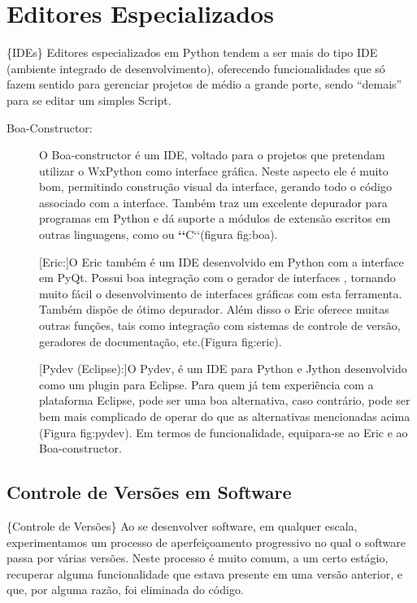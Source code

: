 \documentclass[a4paper,10pt,brazil]{sphinxmanual}
\begin{document}
\chapter{Editores Especializados}
\label{capferr:editores-especializados}
\{IDEs\} Editores especializados em Python tendem a ser mais do tipo
IDE (ambiente integrado de desenvolvimento), oferecendo
funcionalidades que só fazem sentido para gerenciar projetos de
médio a grande porte, sendo ``demais'' para se editar um simples
Script.
\begin{description}
\item[{Boa-Constructor:}] \leavevmode
O Boa-constructor é um IDE, voltado para o projetos que pretendam
utilizar o WxPython como interface gráfica. Neste aspecto ele é
muito bom, permitindo construção visual da interface, gerando todo
o código associado com a interface. Também traz um excelente
depurador para programas em Python e dá suporte a módulos de
extensão escritos em outras linguagens, como  ou
{\color{red}\bfseries{}{}`{}`}C{}`{}`(figura fig:boa).

{[}Eric:{]}O Eric também é um IDE desenvolvido em Python com a
interface em PyQt. Possui boa integração com o gerador de
interfaces , tornando muito fácil o desenvolvimento
de interfaces gráficas com esta ferramenta. Também dispõe de ótimo
depurador. Além disso o Eric oferece muitas outras funções, tais
como integração com sistemas de controle de versão, geradores de
documentação, etc.(Figura fig:eric).

{[}Pydev (Eclipse):{]}O Pydev, é um IDE para Python e Jython
desenvolvido como um plugin para Eclipse. Para quem já tem
experiência com a plataforma Eclipse, pode ser uma boa alternativa,
caso contrário, pode ser bem mais complicado de operar do que as
alternativas mencionadas acima (Figura fig:pydev). Em termos de
funcionalidade, equipara-se ao Eric e ao Boa-constructor.

\end{description}


\section{Controle de Versões em Software}
\label{capferr:controle-de-versoes-em-software}
\{Controle de Versões\} Ao se desenvolver software, em qualquer
escala, experimentamos um processo de aperfeiçoamento progressivo
no qual o software passa por várias versões. Neste processo é muito
comum, a um certo estágio, recuperar alguma funcionalidade que
estava presente em uma versão anterior, e que, por alguma razão,
foi eliminada do código.
\end{document}
